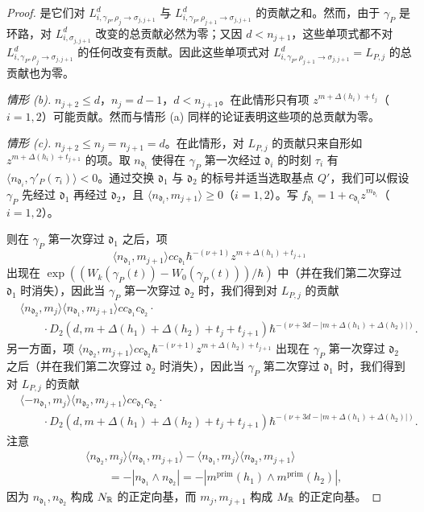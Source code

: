 \begin{proof}
是它们对 $L^d_{i,\gamma_P,\rho_j\to\sigma_{j,j+1}}$ 与 $L^d_{i,\gamma_P,\rho_{j+1}\to\sigma_{j,j+1}}$ 的贡献之和。然而，由于 $\gamma_P$ 是环路，对 $L^d_{i,\sigma_{j,j+1}}$ 改变的总贡献必然为零；又因 $d<n_{j+1}$，这些单项式都不对 $L^d_{i,\gamma_P,\rho_j\to\sigma_{j,j+1}}$ 的任何改变有贡献。因此这些单项式对 $L^d_{i,\gamma_P,\rho_{j+1}\to\sigma_{j,j+1}}=L_{P,j}$ 的总贡献也为零。

\textit{情形 (b).} $n_{j+2}\le d$，$n_j=d-1$，$d<n_{j+1}$。在此情形只有项 $z^{m+\Delta(h_i)+t_j}$（$i=1,2$）可能贡献。然而与情形 (a) 同样的论证表明这些项的总贡献为零。

\textit{情形 (c).} $n_{j+2}\le n_j=n_{j+1}=d$。在此情形，对 $L_{P,j}$ 的贡献只来自形如 $z^{m+\Delta(h_i)+t_{j+1}}$ 的项。取 $n_{\mathfrak d_i}$ 使得在 $\gamma_P$ 第一次经过 $\mathfrak d_i$ 的时刻 $\tau_i$ 有 $\langle n_{\mathfrak d_i},\gamma'_P(\tau_i)\rangle<0$。通过交换 $\mathfrak d_1$ 与 $\mathfrak d_2$ 的标号并适当选取基点 $Q'$，我们可以假设 $\gamma_P$ 先经过 $\mathfrak d_1$ 再经过 $\mathfrak d_2$，且 $\langle n_{\mathfrak d_i},m_{j+1}\rangle\ge0$（$i=1,2$）。写 $f_{\mathfrak d_i}=1+c_{\mathfrak d_i}z^{m_{\mathfrak d_i}}$（$i=1,2$）。

则在 $\gamma_P$ 第一次穿过 $\mathfrak d_1$ 之后，项
\[
  \langle n_{\mathfrak d_1},m_{j+1}\rangle cc_{\mathfrak d_1}\hbar^{-(\nu+1)}z^{m+\Delta(h_1)+t_{j+1}}
\]
出现在 $\exp((W_k(\gamma_P(t))-W_0(\gamma_P(t)))/\hbar)$ 中（并在我们第二次穿过 $\mathfrak d_1$ 时消失），因此当 $\gamma_P$ 第一次穿过 $\mathfrak d_2$ 时，我们得到对 $L_{P,j}$ 的贡献
\[
  \begin{aligned}
    &\langle n_{\mathfrak d_2},m_j\rangle\langle n_{\mathfrak d_1},m_{j+1}\rangle cc_{\mathfrak d_1}c_{\mathfrak d_2}\cdot\\
    &\qquad\cdot D_2(d,m+\Delta(h_1)+\Delta(h_2)+t_j+t_{j+1})
      \hbar^{-(\nu+3d-|m+\Delta(h_1)+\Delta(h_2)|)}.
  \end{aligned}
\]
另一方面，项 $\langle n_{\mathfrak d_2},m_{j+1}\rangle cc_{\mathfrak d_2}\hbar^{-(\nu+1)}z^{m+\Delta(h_2)+t_{j+1}}$ 出现在 $\gamma_P$ 第一次穿过 $\mathfrak d_2$ 之后（并在我们第二次穿过 $\mathfrak d_2$ 时消失），因此当 $\gamma_P$ 第二次穿过 $\mathfrak d_1$ 时，我们得到对 $L_{P,j}$ 的贡献
\[
  \begin{aligned}
    &\langle-n_{\mathfrak d_1},m_j\rangle\langle n_{\mathfrak d_2},m_{j+1}\rangle cc_{\mathfrak d_1}c_{\mathfrak d_2}\cdot\\
    &\qquad\cdot D_2(d,m+\Delta(h_1)+\Delta(h_2)+t_j+t_{j+1})
      \hbar^{-(\nu+3d-|m+\Delta(h_1)+\Delta(h_2)|)}.
  \end{aligned}
\]
注意
\[
  \begin{aligned}
    &\langle n_{\mathfrak d_2},m_j\rangle\langle n_{\mathfrak d_1},m_{j+1}\rangle
    -\langle n_{\mathfrak d_1},m_j\rangle\langle n_{\mathfrak d_2},m_{j+1}\rangle\\
    &\qquad=-|n_{\mathfrak d_1}\wedge n_{\mathfrak d_2}|
    =-|m^{\mathrm{prim}}(h_1)\wedge m^{\mathrm{prim}}(h_2)|,
  \end{aligned}
\]
因为 $n_{\mathfrak d_1},n_{\mathfrak d_2}$ 构成 $N_{\mathbb{R}}$ 的正定向基，而 $m_j,m_{j+1}$ 构成 $M_{\mathbb{R}}$ 的正定向基。


\end{proof}
